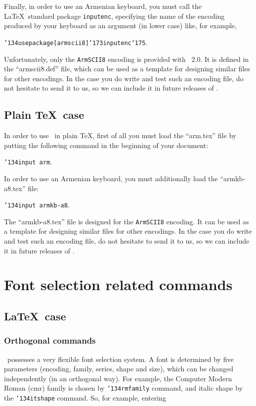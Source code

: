 \documentclass[12pt,a4paper,draft]{article}
\def\mybs{\char'134}
\def\mylbrace{\char'173}
\def\myrbrace{\char'175}
\def\myindent{\leavevmode}
\begin{document}
Finally, in order to use an Armenian keyboard, you must call the
\LaTeX\ standard package {\tt inputenc}, specifying the name of the encoding
produced by your keyboard as an argument (in lower case) like, for example,

{\tt \mybs usepackage[armscii8]\mylbrace inputenc\myrbrace}\qquad.

Unfortunately, only the {\tt ArmSCII8} encoding is provided with
\latArmTeX~2.0. It is defined in the ``armscii8.def'' file, which can be used
as a template for designing similar files for other encodings. In the case you
do write and test such an encoding file, do not hesitate to send it to us, so
we can include it in future releases of \latArmTeX.


\subsection{Plain \TeX\ case}

\myindent In order to use \latArmTeX\ in plain \TeX, first of all you must
load the ``arm.tex'' file by putting the following command in the beginning of
your document:

{\tt \mybs input arm}\qquad.

In order to use an Armenian keyboard, you must additionally load the
``armkb-a8.tex'' file:

{\tt \mybs input armkb-a8}\qquad.

The ``armkb-a8.tex'' file is designed for the {\tt ArmSCII8} encoding. It can
be used as a template for designing similar files for other encodings. In the
case you do write and test such an encoding file, do not hesitate to send it
to us, so we can include it in future releases of \latArmTeX.


\section{Font selection related commands}
\subsection{\LaTeX\ case}
\label{lfonts}

\subsubsection{Orthogonal commands}

\myindent \LaTeXe\ possesses a very flexible font selection system. A font is
determined by five parameters (encoding, family, series, shape and size),
which can be changed independently (in an orthogonal way). For example, the
Computer Modern Roman (cmr) family is chosen by {\tt \mybs rmfamily} command,
and italic shape by the {\tt \mybs itshape} command. So, for example, entering
\end{document}
